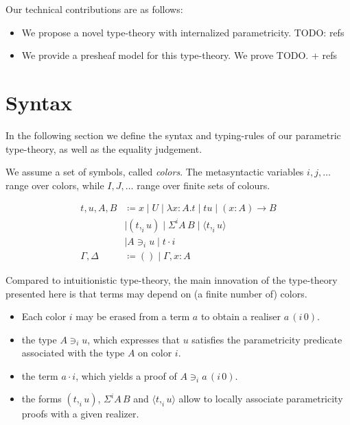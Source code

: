 \documentclass[english]{PaperTools/latex/lipics}
\newcommand\CP[3]{(#2,_{#1} #3)}
\newcommand\param[1]{\!\cdot\!#1}
\newcommand\op[1]{∋_{#1}}
\newcommand\ip[3]{Σ^{#1} {#2}\,{#3}}
\newcommand\fp[3]{⟨#2 ,_{#1} #3⟩}
\newcommand\mor[2]{({#1}\,{#2})}
\newcommand\proj[2]{{#2}\,\mor{#1}0}
\newcommand\comment[1]{}
\begin{document}
Our technical contributions are as follows:
\begin{itemize}
\item We propose a novel type-theory with internalized
  parametricity.  TODO: refs
\item We provide a presheaf model for this type-theory. We prove
  TODO. + refs
\end{itemize}

\section{Syntax}
In the following section we define the syntax and typing-rules of our
parametric type-theory, as well as the equality judgement.

We assume a set of symbols, called \emph{colors}.
The metasyntactic variables $i,j,\ldots$ range over colors, while
$I,J,…$ range over finite sets of colours.

\begin{definition}
  \begin{align*}
    t,u,A,B & \coloneqq x \mid U \mid λx:A. t      \mid t u \mid (x:A) → B \\
            & \mid \CP i t u  \mid \ip i A B  \mid \fp i t u \\
            & \mid A \op i u \mid t \param i  \\
    \Gamma,\Delta & \coloneqq () \mid \Gamma,x:A
  \end{align*}
\end{definition}

Compared to intuitionistic type-theory, the main innovation of the
type-theory presented here is that terms may depend on (a finite
number of) colors. 

\begin{itemize}
\item Each color $i$ may be erased from a term $a$ to obtain a realiser $\proj i a$.
\item the type $A \op i u$, which expresses that $u$ satisfies the
  parametricity predicate associated with the type $A$ on color $i$.
\item the term $a \param i$, which yields a proof of $A \op i \proj i a$.
\item the forms $\CP i t u$, $\ip i A B$ and $\fp i t u$ allow to
  locally associate parametricity proofs with a given realizer.
\end{itemize}
\end{document}
